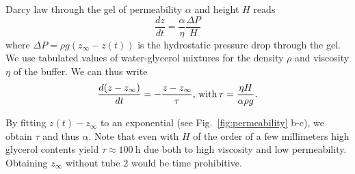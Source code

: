 \documentclass[twocolumn,superscriptaddress,showpacs,preprintnumbers,
amsmath,amssymb,prl]{revtex4-1}
\begin{document}
Darcy law through the gel of permeability $\alpha$ and height $H$ reads 
\begin{equation}
\frac{dz}{dt} = \frac{\alpha}{\eta}\frac{\Delta P}{H}
\end{equation}
where $\Delta P=\rho g(z_\infty-z(t))$ is the hydrostatic pressure drop through the gel. We use tabulated values of water-glycerol mixtures for the density $\rho$ and viscosity $\eta$ of the buffer. We can thus write
\begin{equation}
\frac{d(z-z_\infty)}{dt} = -\frac{z-z_\infty}{\tau}\text{, with\,} \tau = \frac{\eta H}{\alpha \rho g}.
\end{equation}

By fitting $z(t)-z_\infty$ to an exponential (see Fig.~\ref{fig:permeability} b-c), we obtain $\tau$ and thus $\alpha$. Note that even with $H$ of the order of a few millimeters high glycerol contents yield $\tau\approx \SI{100}{\hour}$ due both to high viscosity and low permeability. Obtaining $z_\infty$ without tube 2 would be time prohibitive.
\end{document}
